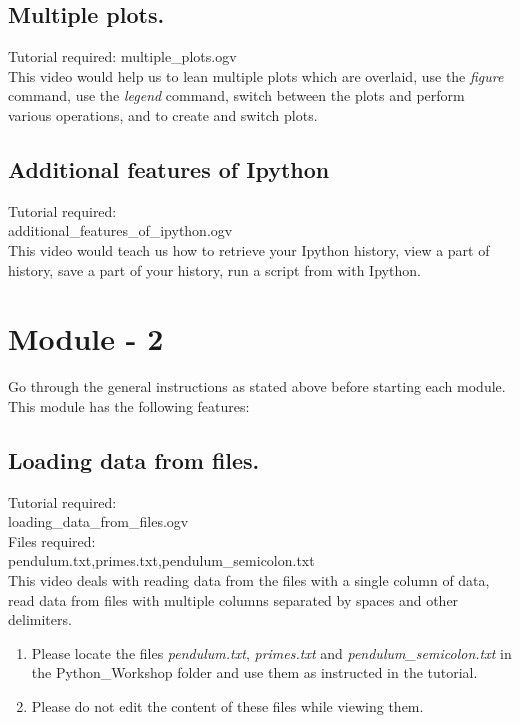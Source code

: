 \documentclass[11pt,twocolumn]{article}
\newenvironment{enumcpt}{\begin{enumerate} \topsep 0pt \partopsep 0pt 
                        \parsep 0pt
                        \itemsep 0pt \leftmargin -1in \rightmargin 0pt
                        }{\end{enumerate}}
\begin{document}
    \subsection{Multiple plots.}
    Tutorial required: multiple\_plots.ogv \\
      This video would help us to lean multiple plots which are overlaid, use the \emph{figure} command, use the \emph{legend} command, switch between the plots and perform various operations, and to create and switch plots. 

    \subsection{Additional features of Ipython}
     Tutorial required: \\additional\_features\_of\_ipython.ogv \\
    This video would teach us how to retrieve your Ipython history, view a part of history, save a part of your history, run a script from with Ipython. \\

\section{Module - 2}
Go through the general instructions as stated above before starting each module.\\
This module has the following features:
  \subsection{Loading data from files.}
  Tutorial required: \\loading\_data\_from\_files.ogv \\
  Files required:\\ pendulum.txt,primes.txt,pendulum\_semicolon.txt \\
  This video deals with reading data from the files with a single column of data, read data from files with multiple columns separated by spaces and other delimiters. 
\begin{enumcpt}
\item Please locate the files \emph{pendulum.txt}, \emph{primes.txt} and \emph{pendulum\_semicolon.txt} in the Python\_Workshop folder and use them
      as instructed in the tutorial.
\item Please do not edit the content of these files while viewing them.
\end{enumcpt}
\end{document}
